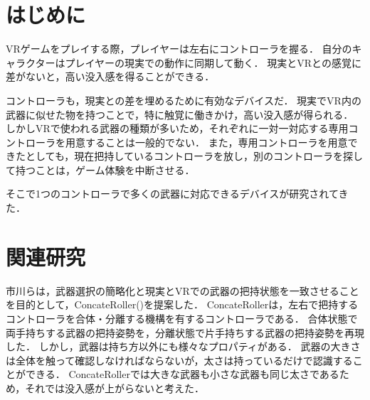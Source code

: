 \documentclass[uplatex]{jsarticle}
\begin{document}
\vspace{3mm}

\setcounter{page}{15}

\section{はじめに}

VRゲームをプレイする際，プレイヤーは左右にコントローラを握る．
自分のキャラクターはプレイヤーの現実での動作に同期して動く．
現実とVRとの感覚に差がないと，高い没入感を得ることができる．

コントローラも，現実との差を埋めるために有効なデバイスだ．
現実でVR内の武器に似せた物を持つことで，特に触覚に働きかけ，高い没入感が得られる．
しかしVRで使われる武器の種類が多いため，それぞれに一対一対応する専用コントローラを用意することは一般的でない．
また，専用コントローラを用意できたとしても，現在把持しているコントローラを放し，別のコントローラを探して持つことは，ゲーム体験を中断させる．

そこで1つのコントローラで多くの武器に対応できるデバイスが研究されてきた．


\section{関連研究}


市川らは，武器選択の簡略化と現実とVRでの武器の把持状態を一致させることを目的として，ConcateRoller()を提案した\cite{市川2025ConcateRoller}．
ConcateRollerは，左右で把持するコントローラを合体・分離する機構を有するコントローラである．
合体状態で両手持ちする武器の把持姿勢を，分離状態で片手持ちする武器の把持姿勢を再現した．
しかし，武器は持ち方以外にも様々なプロパティがある．
武器の大きさは全体を触って確認しなければならないが，太さは持っているだけで認識することができる．
ConcateRollerでは大きな武器も小さな武器も同じ太さであるため，それでは没入感が上がらないと考えた．
\end{document}
